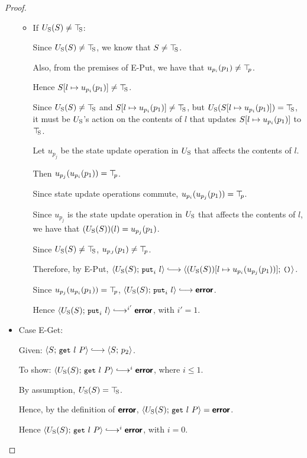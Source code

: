 \begin{proof}
\begin{itemize}
\begin{itemize}
    \item If $U_{\mathrm{S}}(S) \neq \top\hspace{-0.85mm}_{\mathrm{S}}$:

      Since $U_{\mathrm{S}}(S) \neq \top\hspace{-0.85mm}_{\mathrm{S}}$, we know that $S \neq \top\hspace{-0.85mm}_{\mathrm{S}}$.

      Also, from the premises of {\sc E-Put}, we have that
      $u_{p_i}(p_1) \neq \top\hspace{-0.85mm}_{p}$.

      Hence $S[l \mapsto u_{p_i}(p_1)] \neq \top\hspace{-0.85mm}_{\mathrm{S}}$.

      Since $U_{\mathrm{S}}(S) \neq \top\hspace{-0.85mm}_{\mathrm{S}}$ and $S[l \mapsto u_{p_i}(p_1)]
      \neq \top\hspace{-0.85mm}_{\mathrm{S}}$, but $U_{\mathrm{S}}(S[l \mapsto u_{p_i}(p_1)]) = \top\hspace{-0.85mm}_{\mathrm{S}}$,
      it must be $U_{\mathrm{S}}$'s action on the contents of $l$ that updates
      $S[l \mapsto u_{p_i}(p_1)]$ to $\top\hspace{-0.85mm}_{\mathrm{S}}$.

      Let $u_{p_j}$ be the state update operation in $U_{\mathrm{S}}$ that
      affects the contents of $l$.

      Then $u_{p_j}(u_{p_i}(p_1)) = \top\hspace{-0.85mm}_{p}$.

      Since state update operations commute, $u_{p_i}(u_{p_j}(p_1))
      = \top\hspace{-0.85mm}_{p}$.

      Since $u_{p_j}$ is the state update operation in $U_{\mathrm{S}}$ that
      affects the contents of $l$, we have that $(U_{\mathrm{S}}(S))(l) =
      u_{p_j}(p_1)$.

      Since $U_{\mathrm{S}}(S) \neq \top\hspace{-0.85mm}_{\mathrm{S}}$, $u_{p_J}(p_1) \neq \top\hspace{-0.85mm}_{p}$.

      Therefore, by {\sc E-Put}, $\config{\Ustore(S)}{\putiexp{l}}
      \parstepsto
      \config{\extSRaw{(\Ustore(S))}{l}{u_{p_i}(u_{p_j}(p_1))}}{\unit}$.

      Since $u_{p_j}(u_{p_i}(p_1)) = \top\hspace{-0.85mm}_{p}$,
      $\config{\Ustore(S)}{\putiexp{l}} \parstepsto \error$.

      Hence $\config{\Ustore(S)}{\putiexp{l}}
      \parstepsto^{i'} \error$, with $i' = 1$.

    \end{itemize}

  \item Case {\sc E-Get}:

    Given: $\config{S}{\getexp{l}{P}} \parstepsto \config{S}{p_2}$.

    To show: $\config{\Ustore(S)}{\getexp{l}{P}} \parstepsto^i \error$,
    where $i \leq 1$.

    By assumption, $U_{\mathrm{S}}(S) = \top\hspace{-0.85mm}_{\mathrm{S}}$.

    Hence, by the definition of $\textbf{\textsf{error}}$,
    $\langle U_{\mathrm{S}}(S);\, \mbox{\small{\texttt{get}}}~l~P \rangle = \textbf{\textsf{error}}$.

    Hence $\config{\Ustore(S)}{\getexp{l}{P}} \parstepsto^i \error$, with
    $i = 0$.


\end{itemize}
\end{proof}

